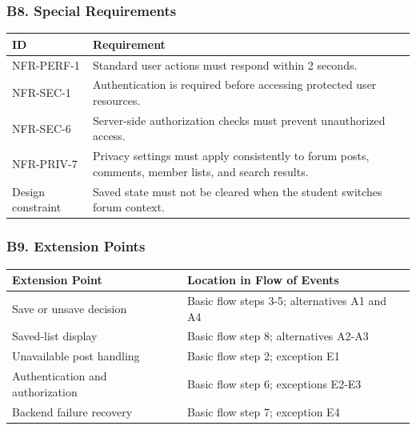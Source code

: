 \documentclass[12pt]{article}
\renewcommand{\baselinestretch}{1.5}
\begin{document}
\hypertarget{sec:b8-special-requirements}{}
\subsubsection*{B8. Special Requirements}
\par\medskip

\begingroup
\small
\renewcommand{\baselinestretch}{1.0}\selectfont
\renewcommand{\arraystretch}{1.15}
\setlength{\tabcolsep}{6pt}
\begin{longtable}{|>{\raggedright\arraybackslash}p{}|>{\raggedright\arraybackslash}p{}|}
\hline
\textbf{ID} & \textbf{Requirement} \\ \hline
\endhead
NFR-PERF-1 & Standard user actions must respond within 2 seconds. \\ \hline
NFR-SEC-1 & Authentication is required before accessing protected user resources. \\ \hline
NFR-SEC-6 & Server-side authorization checks must prevent unauthorized access. \\ \hline
NFR-PRIV-7 & Privacy settings must apply consistently to forum posts, comments, member lists, and search results. \\ \hline
Design constraint & Saved state must not be cleared when the student switches forum context. \\ \hline
\end{longtable}
\endgroup
\par\medskip

\hypertarget{sec:b9-extension-points}{}
\subsubsection*{B9. Extension Points}
\par\medskip

\begingroup
\small
\renewcommand{\baselinestretch}{1.0}\selectfont
\renewcommand{\arraystretch}{1.15}
\setlength{\tabcolsep}{6pt}
\begin{longtable}{|>{\raggedright\arraybackslash}p{}|>{\raggedright\arraybackslash}p{}|}
\hline
\textbf{Extension Point} & \textbf{Location in Flow of Events} \\ \hline
\endhead
Save or unsave decision & Basic flow steps 3-5; alternatives A1 and A4 \\ \hline
Saved-list display & Basic flow step 8; alternatives A2-A3 \\ \hline
Unavailable post handling & Basic flow step 2; exception E1 \\ \hline
Authentication and authorization & Basic flow step 6; exceptions E2-E3 \\ \hline
Backend failure recovery & Basic flow step 7; exception E4 \\ \hline
\end{longtable}
\endgroup
\par\medskip
\end{document}
